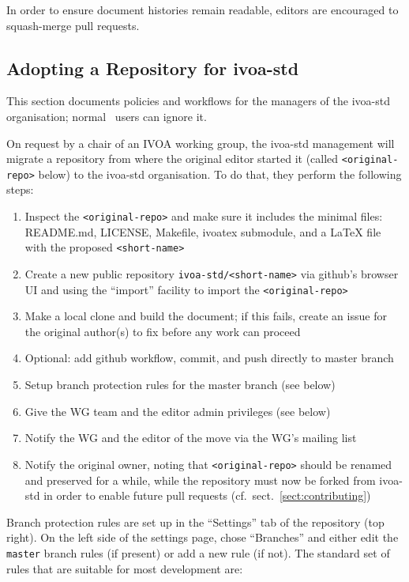 \documentclass[11pt,a4paper]{ivoa}
\begin{document}
In order to ensure document histories remain readable, editors are
encouraged to squash-merge pull requests.

\subsection{Adopting a Repository for ivoa-std}

This section documents policies and workflows for the managers of the
ivoa-std organisation; normal \ivoatex~users can ignore it.

On request by a chair of an IVOA working group, the ivoa-std management
will migrate a repository from where the original editor started it
(called \verb|<original-repo>| below) to the ivoa-std organisation.  To
do that, they perform the following steps:

\begin{enumerate}
\item Inspect the \verb|<original-repo>| and make sure it includes the minimal
files: README.md, LICENSE, Makefile, ivoatex submodule, and a LaTeX
file with the proposed \verb|<short-name>|
\item Create a new public repository \verb|ivoa-std/<short-name>| via github's
browser UI and using the ``import'' facility to import the \verb|<original-repo>|
\item Make a local clone and build the document; if this fails, create an issue
for the original author(s) to fix before any work can proceed
\item Optional: add github workflow, commit, and push directly to master branch
\item Setup branch protection rules for the master branch (see below)
\item Give the WG team and the editor admin privileges (see below)
\item Notify the WG and the editor of the move via the WG's mailing list
\item Notify the original owner, noting that \verb|<original-repo>|
should be renamed and preserved for a while, while the repository must
now be forked from ivoa-std in order to enable future pull requests
(cf.~sect.~\ref{sect:contributing})
\end{enumerate}

Branch protection rules are set up in the ``Settings'' tab of the repository (top right). 
On the left side of the settings page, chose ``Branches'' and either edit the \verb|master|
branch rules (if present) or add a new rule (if not). The standard set of rules that are
suitable for most development are:
\end{document}
